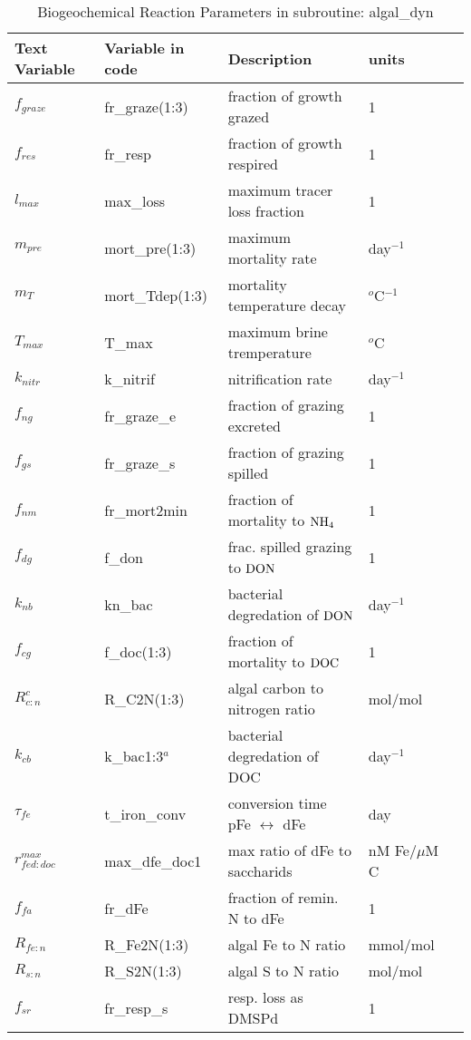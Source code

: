 \begin{table}[t!]
  \caption{Biogeochemical Reaction Parameters in subroutine: algal\_dyn}    
\begin{threeparttable}
\begin{tabular}{l|l|l|l|l} \hline %
Text Variable & Variable in code & Description &  units \\ \hline
$f_{graze}$ & fr\_graze(1:3) & fraction of growth grazed &  1  \\
$f_{res}$ & fr\_resp& fraction of growth respired & 1 \\
$l_{max}$ & max\_loss & maximum tracer loss fraction & 1  \\
$m_{pre}$ & mort\_pre(1:3) & maximum mortality rate   & day$^{-1}$ \\
$m_{T}$ & mort\_Tdep(1:3) & mortality temperature decay & $^o$C$^{-1}$  \\
$T_{max}$ & T\_max& maximum brine tremperature & $^o$C \\
$k_{nitr}$ & k\_nitrif & nitrification rate  & day$^{-1}$  \\
$f_{ng}$ & fr\_graze\_e & fraction of grazing excreted  & 1 \\
$f_{gs}$ & fr\_graze\_s & fraction of grazing spilled & 1  \\
$f_{nm}$ & fr\_mort2min & fraction of mortality to $\mbox{NH$_4$}$  &1 \\
$f_{dg}$ & f\_don & frac. spilled grazing to $\mbox{DON}$  & 1 \\
$k_{nb}$ & kn\_bac & bacterial degredation of $\mbox{DON}$ &
day$^{-1}$  \\
$f_{cg}$ & f\_doc(1:3) & fraction of mortality to $\mbox{DOC}$ &
1 \\
$R_{c:n}^c$& R\_C2N(1:3) & algal carbon to nitrogen ratio & mol/mol  \\ 
$k_{cb}$ & k\_bac{1:3}$^a$ & bacterial degredation of DOC & day$^{-1}$  \\
$\tau_{fe}$ & t\_iron\_conv & conversion time pFe $\leftrightarrow$ dFe
 & day \\
$r^{max}_{fed:doc}$ & max\_dfe\_doc1 & max ratio of dFe to saccharids
 & nM Fe$/\mu$M C \\
$f_{fa}$ & fr\_dFe & fraction of remin. N to dFe  & 1 \\
$R_{fe:n}$ & R\_Fe2N(1:3) & algal Fe to N ratio &
mmol/mol \\
$R_{s:n}$ & R\_S2N(1:3) & algal S to N ratio &
mol/mol  \\
$f_{sr}$ & fr\_resp\_s & resp. loss as DMSPd & 1  \\

\end{tabular}
\end{threeparttable}
\end{table}
